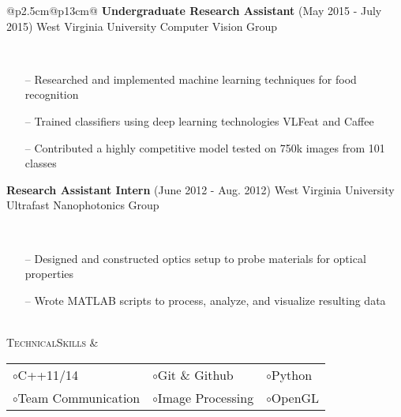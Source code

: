 \documentclass{article}
\begin{document}
\begin{tabular}{@{}p{2.5cm}@{\hspace{0.2cm}}p{13cm}@{}}
\textbf{Undergraduate Research Assistant}
\hfill\small(May 2015 - July 2015)\normalsize
\newline West Virginia University Computer Vision Group
\par\,\small
\begin{itemize}[leftmargin=*,nolistsep,noitemsep]
  \item[--]Researched and implemented machine learning techniques for food recognition
  \item[--]Trained classifiers using deep learning technologies VLFeat and Caffee
  \item[--]Contributed a highly competitive model tested on 750k images from 101 classes
\newline
\end{itemize}
\normalsize

\textbf{Research Assistant Intern}
\hfill\small(June 2012 - Aug. 2012)\normalsize
\newline West Virginia University Ultrafast Nanophotonics Group
\par\,\small
\begin{itemize}[leftmargin=*, nolistsep,noitemsep]
  \item[--]Designed and constructed optics setup to probe materials for optical properties
  \item[--]Wrote MATLAB scripts to process, analyze, and visualize resulting data
\end{itemize}
\normalsize \\


\vspace*{-2.5em}\textsc{Technical}\newline\textsc{Skills} &
\setlength{\tabcolsep}{12pt}
\begin{tabular}{@{}lll@{}}

$\circ$\enspace C++11/14 &
$\circ$\enspace Git \& Github &
$\circ$\enspace Python \\

$\circ$\enspace Team Communication &
$\circ$\enspace Image Processing &
$\circ$\enspace OpenGL \\


\end{tabular}
\end{tabular}
\end{document}
